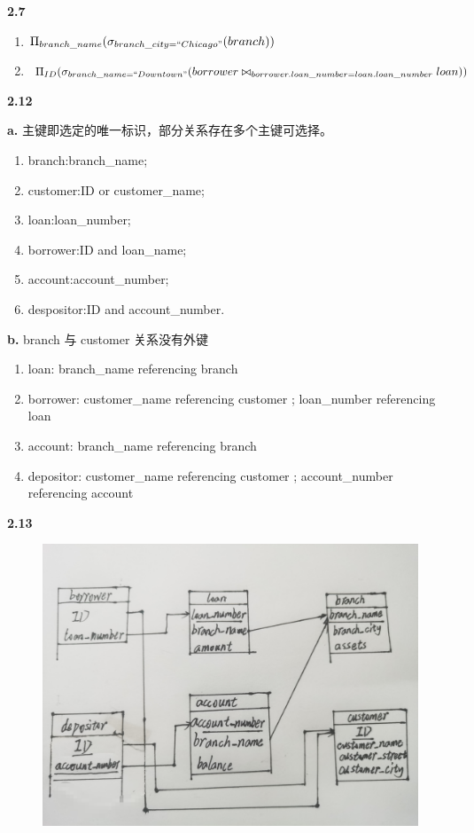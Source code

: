 \documentclass{article}
\begin{document}
	
\Large		
\noindent\textbf{2.7}\par
\begin{enumerate}
\item $\Pi_{branch\_name}(\sigma_{branch\_city=``Chicago"}(branch))$
\item \(\Pi_{ID}(\sigma_{branch\_name=``Downtown"}(borrower\bowtie_{borrower.loan\_number=loan.loan\_number}loan))\)
\end{enumerate}

\noindent\textbf{2.12}\par
\setlength{\parindent}{1em}
\textbf{a.} 主键即选定的唯一标识，部分关系存在多个主键可选择。
\begin{enumerate}[itemindent=1em]
\item branch:branch\_name;\quad
\item customer:ID or customer\_name;\quad
\item loan:loan\_number;\quad
\item borrower:ID and loan\_name;\quad
\item account:account\_number;\quad
\item despositor:ID and account\_number.
\end{enumerate}


\textbf{b.} branch 与 customer 关系没有外键
\begin{enumerate}[itemindent=1em]
\item loan: branch\_name referencing branch
\item borrower: customer\_name referencing customer ; loan\_number referencing loan
\item account: branch\_name referencing branch
\item depositor: customer\_name referencing customer ; account\_number referencing account
\end{enumerate}

\newpage
\noindent\textbf{2.13}\par
\begin{figure}[h]
    \centering
    \includegraphics[scale=0.1]{1.jpg}
    \end{figure} 
\end{document}
